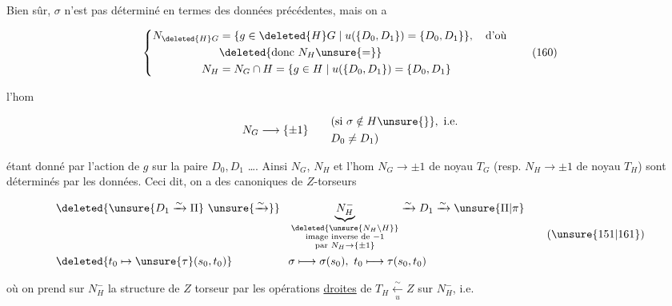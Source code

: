 
Bien sûr, $\sigma$ n'est pas déterminé en termes des données précédentes, mais on a

\[
\left\{\begin{aligned}
N_{\deleted{H}G}&=\{g\in\deleted{H}G\mid u(\{D_0,D_1\})=\{D_0,D_1\}\},\quad\text{d'où}\\
&\deleted{\text{donc }N_H\unsure{=}}\\
N_H&=N_G\cap H=\{g\in H\mid u(\{D_0,D_1\})=\{D_0,D_1\}
\end{aligned}\right.\tag*{(160)}
\]

l'hom

\[
N_G\longrightarrow\{\pm1\}\qquad
\begin{aligned}&(\text{si }\sigma\notin H\unsure{\}},\text{ i.e.}\\&D_0\ne D_1)\end{aligned}
\]

étant donné par l'action de $g$ sur la paire $D_0,D_1$ \ldots. Ainsi $N_G$, $N_H$ et l'hom $N_G\to\pm1$  de noyau $T_G$ (resp. $N_H\to\pm1$ de noyau $T_H$) sont déterminés par les données. Ceci dit, on a des  canoniques de $Z$-torseurs

\[
\begin{aligned}
&\deleted{\unsure{D_1\xrightarrow{\sim}\Pi}\ \unsure{\xrightarrow{\sim}}}\quad
\underset{\substack{\deleted{\unsure{N_H\setminus H}}\\\text{image inverse de }-1\\\text{par }N_H\to\{\pm1\}}}{\underbrace{N_H^-}}\xrightarrow{\sim}D_1\xrightarrow{\sim}\unsure{\Pi|\pi}\\
&\deleted{t_0\mapsto\unsure{\tau}(s_0,t_0)}\hspace{5em}
\sigma\longmapsto\sigma(s_0),\ t_0\longmapsto\tau(s_0,t_0)
\end{aligned}\tag*{(\unsure{151|161})}
\]

  où on prend sur $N_H^-$ la structure de $Z$ torseur  par les opérations \uline{droites} de $T_H\xleftarrow[u]{\sim}Z$ sur $N_H^-$, i.e. \deleted{\unsure{$\lambda$}}

